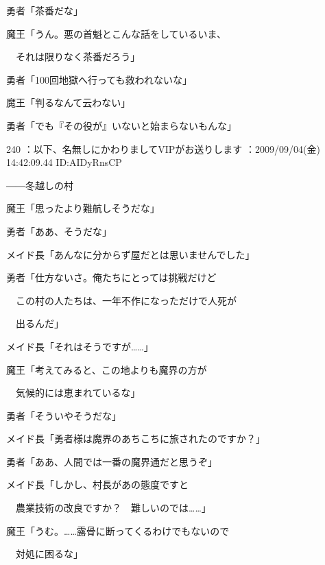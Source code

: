 \documentclass[a4j,twocolumn]{tarticle}
\begin{document}
勇者「茶番だな」 



魔王「うん。悪の首魁とこんな話をしているいま、\par{} 
　それは限りなく茶番だろう」 



勇者「100回地獄へ行っても救われないな」 



魔王「判るなんて云わない」 



勇者「でも『その役が』いないと始まらないもんな」 

	
    
    
    
240 ：以下、名無しにかわりましてVIPがお送りします ：2009/09/04(金) 14:42:09.44 ID:AIDyRnsCP


――冬越しの村 



魔王「思ったより難航しそうだな」\par{} 
勇者「ああ、そうだな」\par{} 
メイド長「あんなに分からず屋だとは思いませんでした」 



勇者「仕方ないさ。俺たちにとっては挑戦だけど\par{} 
　この村の人たちは、一年不作になっただけで人死が\par{} 
　出るんだ」 



メイド長「それはそうですが……」 



魔王「考えてみると、この地よりも魔界の方が\par{} 
　気候的には恵まれているな」 



勇者「そういやそうだな」 



メイド長「勇者様は魔界のあちこちに旅されたのですか？」\par{} 
勇者「ああ、人間では一番の魔界通だと思うぞ」 



メイド長「しかし、村長があの態度ですと\par{} 
　農業技術の改良ですか？　難しいのでは……」 



魔王「うむ。……露骨に断ってくるわけでもないので\par{} 
　対処に困るな」\par{} 
\end{document}
